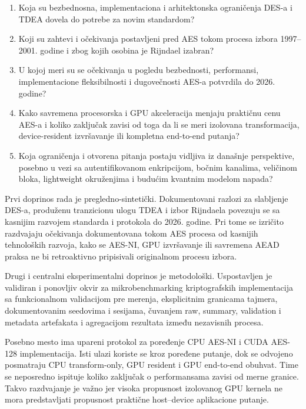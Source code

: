 \begin{enumerate}
    \item[\textbf{IP1}] Koja su bezbednosna, implementaciona i
    arhitektonska ograničenja DES-a i TDEA dovela do potrebe za novim
    standardom?

    \item[\textbf{IP2}] Koji su zahtevi i očekivanja postavljeni pred
    AES tokom procesa izbora 1997--2001. godine i zbog kojih osobina je
    Rijndael izabran?

    \item[\textbf{IP3}] U kojoj meri su se očekivanja u pogledu
    bezbednosti, performansi, implementacione fleksibilnosti i
    dugovečnosti AES-a potvrdila do 2026. godine?

    \item[\textbf{IP4}] Kako savremena procesorska i GPU akceleracija
    menjaju praktičnu cenu AES-a i koliko zaključak zavisi od toga da li
    se meri izolovana transformacija, device-resident izvršavanje ili
    kompletna end-to-end putanja?

    \item[\textbf{IP5}] Koja ograničenja i otvorena pitanja postaju
    vidljiva iz današnje perspektive, posebno u vezi sa autentifikovanom
    enkripcijom, bočnim kanalima, veličinom bloka, lightweight
    okruženjima i budućim kvantnim modelom napada?
\end{enumerate}

Prvi doprinos rada je pregledno-sintetički. Dokumentovani razlozi za
slabljenje DES-a, produženu tranzicionu ulogu TDEA i izbor Rijndaela
povezuju se sa kasnijim razvojem standarda i protokola do 2026. godine.
Pri tome se izričito razdvajaju očekivanja dokumentovana tokom AES procesa
od kasnijih tehnoloških razvoja, kako se AES-NI, GPU izvršavanje ili
savremena AEAD praksa ne bi retroaktivno pripisivali originalnom procesu
izbora.

Drugi i centralni eksperimentalni doprinos je metodološki. Uspostavljen
je validiran i ponovljiv okvir za mikrobenchmarking kriptografskih
implementacija sa funkcionalnom validacijom pre merenja, eksplicitnim
granicama tajmera, dokumentovanim seedovima i sesijama, čuvanjem raw,
summary, validation i metadata artefakata i agregacijom rezultata između
nezavisnih procesa.

Posebno mesto ima upareni protokol za poređenje CPU AES-NI i CUDA
AES-128 implementacija. Isti ulazi koriste se kroz poređene putanje, dok
se odvojeno posmatraju CPU transform-only, GPU resident i GPU end-to-end
obuhvat. Time se neposredno ispituje koliko zaključak o performansama
zavisi od merne granice. Takvo razdvajanje je važno jer visoka propusnost
izolovanog GPU kernela ne mora predstavljati propusnost praktične
host--device aplikacione putanje.

